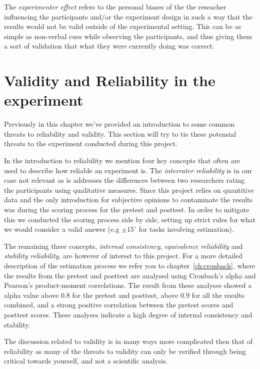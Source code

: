 	\bigskip\noindent
	The \textit{experimenter effect} refers to the personal biases of the the reseacher influencing the participants and/or the experiment design in such a way that the results would not be valid outside of the experimental setting. This can be as simple as non-verbal cues while observing the participants, and thus giving them a sort of validation that what they were currently doing was correct. 
	
	
\section{Validity and Reliability in the experiment}
	Previously in this chapter we've provided an introduction to some common threats to reliability and validity. This section will try to tie these potensial threats to the experiment conducted during this project. 
	
	\bigskip\noindent
	In the introduction to reliability we mention four key concepts that often are used to describe how reliable an experiment is. The \textit{interrater reliability} is in our case not relevant as is addresses the differences between two researchers rating the participants using qualitative measures. Since this project relies on quantitive data and the only introduction for subjective opinions to contaminate the results was during the scoring process for the pretest and posttest. In order to mitigate this we conducted the scoring process side by side, setting up strict rules for what we would consider a valid answer (e.g $\pm 15^{\circ}$ for tasks involving estimation).
	
	\bigskip\noindent
	The remaining three concepts, \textit{internal consistency}, \textit{equivalence reliability} and \textit{stability reliability}, are however of interest to this project. 
	For a more detailed description of the estimation process we refer you to chapter~\ref{ch:cronbach}, where the results from the pretest and posttest are analysed using Cronbach's alpha and Pearson's product-moment correlations. The result from these analyses showed a alpha value above $0.8$ for the pretest and posttest, above $0.9$ for all the results combined, and a strong positive correlation between the pretest scores and posttest scores. These analyses indicate a high degree of internal consistency and stability.
	
	\bigskip\noindent
	The discussion related to validity is in many ways more complicated then that of reliability as many of the threats to validity can only be verified through being critical towards yourself, and not a scientific analysis. 
	
